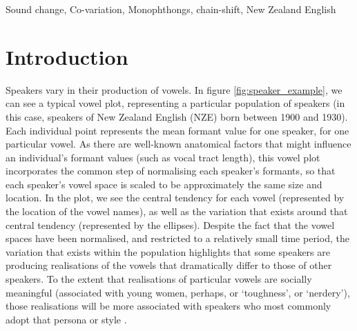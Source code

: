 \documentclass[review]{elsarticle} %
\begin{document}
\begin{frontmatter}
\begin{keyword}
Sound change, Co-variation, Monophthongs, chain-shift, New Zealand English
\end{keyword}

\end{frontmatter}

\linenumbers


\section{Introduction}


Speakers vary in their production of vowels.  In figure \ref{fig:speaker_example}, we can see a typical vowel plot, representing a particular population of speakers (in this case, speakers of New Zealand English (NZE) born between 1900 and 1930).  Each individual point represents the mean formant value for one speaker, for one particular vowel.  As there are well-known anatomical factors that might influence an individual’s formant values (such as vocal tract length), this vowel plot incorporates the common step of normalising each speaker’s formants, so that each speaker’s vowel space is scaled to be approximately the same size and location.   In the plot, we see the central tendency for each vowel (represented by the location of the vowel names), as well as the variation that exists around that central tendency (represented by the ellipses). Despite the fact that the vowel spaces have been normalised, and restricted to a relatively small time period, the variation that exists within the population highlights that some speakers are producing realisations of the vowels that dramatically differ to those of other speakers.    To the extent that realisations of particular vowels are socially meaningful (associated with young women, perhaps, or `toughness', or `nerdery'), those realisations will be more associated with speakers who most commonly adopt that persona or style \citep{eckert2018meaning}.
\end{document}
